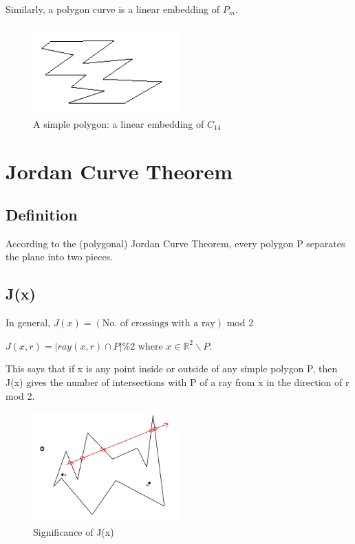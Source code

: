\documentclass{article}
\begin{document}
Similarly, a polygon curve is a linear embedding of $P_m$.

\begin{figure}[h]
    \centering
    \includegraphics[width=0.5\textwidth]{images/fig5-12.png}
    \caption{A simple polygon: a linear embedding of $C_{14}$}
    \label{fig:}
\end{figure}

\section{Jordan Curve Theorem}
\subsection{Definition}
According to the (polygonal) Jordan Curve Theorem, every polygon P separates the plane into two pieces.
\subsection{J(x)}
In general, $J(x) = (\text{No. of crossings with a ray})$ mod 2

$J(x, r) = |ray(x, r) \cap P| \% 2 $ where $x \in \mathbb{R}^2\smallsetminus P$. 

This says that if x is any point inside or outside of any simple polygon P, then J(x) gives the number of intersections with P of a ray from x in the direction of r mod 2.

\begin{figure}[h]
    \centering
    \includegraphics[width=0.5\textwidth]{images/jctSignificance.png}
    \caption{Significance of J(x)}
    \label{fig:jctSignificance}
\end{figure}
\end{document}
